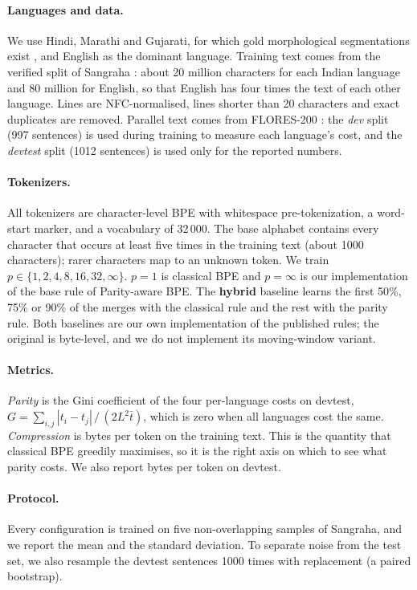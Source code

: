 \documentclass[11pt,a4paper]{article}
\theoremstyle{remark}
\begin{document}
\paragraph{Languages and data.}
We use Hindi, Marathi and Gujarati, for which gold morphological segmentations exist
\cite{rathore2026}, and English as the dominant language. Training text comes from the
verified split of Sangraha \cite{khan2024}: about 20 million characters for each Indian
language and 80 million for English, so that English has four times the text of each other
language. Lines are NFC-normalised, lines shorter than 20 characters and exact duplicates
are removed. Parallel text comes from FLORES-200 \cite{nllb2022}: the \emph{dev} split
(997 sentences) is used during training to measure each language's cost, and the
\emph{devtest} split (1012 sentences) is used only for the reported numbers.

\paragraph{Tokenizers.}
All tokenizers are character-level BPE with whitespace pre-tokenization, a word-start
marker, and a vocabulary of 32\,000. The base alphabet contains every character that occurs
at least five times in the training text (about 1000 characters); rarer characters map to an
unknown token. We train $p\in\{1,2,4,8,16,32,\infty\}$. $p=1$ is classical BPE and
$p=\infty$ is our implementation of the base rule of Parity-aware BPE. The \textbf{hybrid}
baseline learns the first 50\%, 75\% or 90\% of the merges with the classical rule and the
rest with the parity rule. Both baselines are our own implementation of the published
rules; the original is byte-level, and we do not implement its moving-window variant.

\paragraph{Metrics.}
\emph{Parity} is the Gini coefficient of the four per-language costs on devtest,
$G=\sum_{i,j}|t_i-t_j| \,/\, (2L^2\bar t)$, which is zero when all languages cost the same.
\emph{Compression} is bytes per token on the training text. This is the quantity that
classical BPE greedily maximises, so it is the right axis on which to see what parity costs.
We also report bytes per token on devtest.

\paragraph{Protocol.}
Every configuration is trained on five non-overlapping samples of Sangraha, and we report
the mean and the standard deviation. To separate noise from the test set, we also resample
the devtest sentences 1000 times with replacement (a paired bootstrap).
\end{document}

